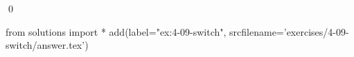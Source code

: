 
\begin{ex}
  \label{ex:4-09-switch}
  
  \qed
\end{ex}
\begin{python0}
from solutions import *
add(label="ex:4-09-switch",
    srcfilename='exercises/4-09-switch/answer.tex')
\end{python0}

